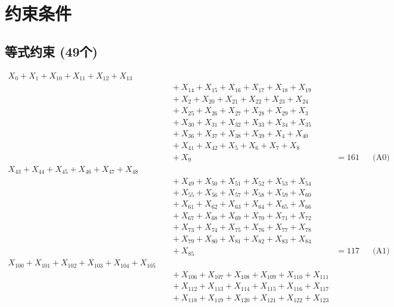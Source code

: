 \documentclass[a4paper,10pt]{article}
\begin{document}
\section{约束条件}

\subsection{等式约束 (49个)}

\allowdisplaybreaks
{\small\begin{align}
X_{0} + X_{1} + X_{10} + X_{11} + X_{12} + X_{13} \\[0.5ex]
&\quad  + X_{14} + X_{15} + X_{16} + X_{17} + X_{18} + X_{19} \\[0.5ex]
&\quad  + X_{2} + X_{20} + X_{21} + X_{22} + X_{23} + X_{24} \\[0.5ex]
&\quad  + X_{25} + X_{26} + X_{27} + X_{28} + X_{29} + X_{3} \\[0.5ex]
&\quad  + X_{30} + X_{31} + X_{32} + X_{33} + X_{34} + X_{35} \\[0.5ex]
&\quad  + X_{36} + X_{37} + X_{38} + X_{39} + X_{4} + X_{40} \\[0.5ex]
&\quad  + X_{41} + X_{42} + X_{5} + X_{6} + X_{7} + X_{8} \\[0.5ex]
&\quad  + X_{9} &= 161 && \text{(A0)} \\
X_{43} + X_{44} + X_{45} + X_{46} + X_{47} + X_{48} \\[0.5ex]
&\quad  + X_{49} + X_{50} + X_{51} + X_{52} + X_{53} + X_{54} \\[0.5ex]
&\quad  + X_{55} + X_{56} + X_{57} + X_{58} + X_{59} + X_{60} \\[0.5ex]
&\quad  + X_{61} + X_{62} + X_{63} + X_{64} + X_{65} + X_{66} \\[0.5ex]
&\quad  + X_{67} + X_{68} + X_{69} + X_{70} + X_{71} + X_{72} \\[0.5ex]
&\quad  + X_{73} + X_{74} + X_{75} + X_{76} + X_{77} + X_{78} \\[0.5ex]
&\quad  + X_{79} + X_{80} + X_{81} + X_{82} + X_{83} + X_{84} \\[0.5ex]
&\quad  + X_{85} &= 117 && \text{(A1)} \\
X_{100} + X_{101} + X_{102} + X_{103} + X_{104} + X_{105} \\[0.5ex]
&\quad  + X_{106} + X_{107} + X_{108} + X_{109} + X_{110} + X_{111} \\[0.5ex]
&\quad  + X_{112} + X_{113} + X_{114} + X_{115} + X_{116} + X_{117} \\[0.5ex]
&\quad  + X_{118} + X_{119} + X_{120} + X_{121} + X_{122} + X_{123} \\[0.5ex]

\end{align}}
\end{document}
